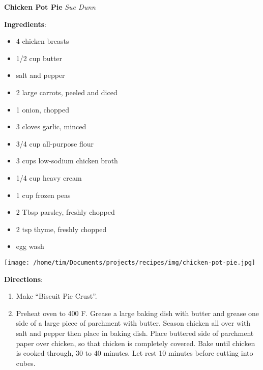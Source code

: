 \documentclass[11pt, twoside, openany]{book}
\begin{document}
\noindent\begin{minipage}[t]{\linewidth}%
{\Large\textbf{Chicken Pot Pie}} \label{chicken-pot-pie}\hfill\textit{Sue Dunn}\\
\noindent\begin{minipage}[t]{0.78\linewidth}%
\textbf{Ingredients}:\vspace{-3mm}
\begin{multicols}{2}
\begin{itemize}\setlength\itemsep{-1mm}
\item 4 chicken breasts
\item 1/2 cup butter
\item salt and pepper
\item 2 large carrots, peeled and diced
\item 1 onion, chopped
\item 3 cloves garlic, minced
\item 3/4 cup all-purpose flour
\item 3 cups low-sodium chicken broth
\item 1/4 cup heavy cream
\item 1 cup frozen peas
\item 2 Tbsp parsley, freshly chopped
\item 2 tsp thyme, freshly chopped
\item egg wash
\end{itemize}
\end{multicols}
\end{minipage}
\noindent\begin{minipage}[t]{0.18\linewidth}
\centering \strut\vspace*{-\baselineskip}\newline
\texttt{[image: /home/tim/Documents/projects/recipes/img/chicken-pot-pie.jpg]}\\
\end{minipage}\vspace{3mm}
\textbf{Directions}:
\vspace{-3mm}\begin{enumerate}\setlength\itemsep{-1mm}
\item Make ``Biscuit Pie Crust''.
\item Preheat oven to 400 F. Grease a large baking dish with butter and grease one side of a large piece of parchment with butter. Season chicken all over with salt and pepper then place in baking dish. Place buttered side of parchment paper over chicken, so that chicken is completely covered. Bake until chicken is cooked through, 30 to 40 minutes. Let rest 10 minutes before cutting into cubes.

\end{enumerate}
\end{minipage}
\end{document}
